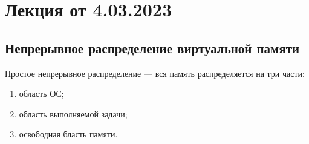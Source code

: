 
\section{Лекция от 4.03.2023}
\subsection{Непрерывное распределение виртуальной памяти}
Простое непрерывное распределение --- вся память распределяется на три части:
\begin{enumerate}
  \item область ОС;
  \item область выполняемой задачи;
  \item освободная бласть памяти.
\end{enumerate}
